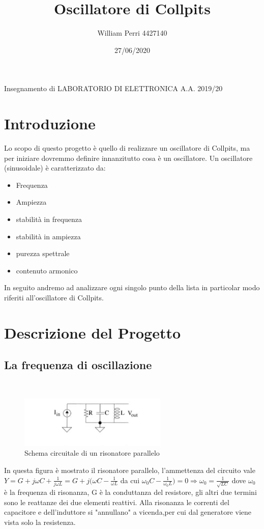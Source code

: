 \documentclass{article}
\title{Oscillatore di Collpits}
\author{William Perri 4427140 }
\date{27/06/2020}
\begin{document}
\maketitle
Insegnamento di LABORATORIO DI ELETTRONICA A.A. 2019/20

\newpage
\tableofcontents
\newpage
\section{Introduzione}
Lo scopo di questo progetto è quello di realizzare un oscillatore di Collpits, ma per iniziare dovremmo definire innanzitutto cosa è un oscillatore.
Un oscillatore (sinusoidale) è caratterizzato da:
\begin{itemize}
\item Frequenza
\item Ampiezza
\item stabilità in frequenza
\item stabilità in ampiezza
\item purezza spettrale
\item contenuto armonico
\end{itemize}
In seguito andremo ad analizzare ogni singolo punto della lista in particolar modo riferiti all'oscillatore di Collpits.
\newpage
\section{Descrizione del Progetto}
\subsection{La frequenza di oscillazione}
~\begin{figure}[H]
\includegraphics[scale=2]{RisonatoreParallelo.png} 
\centering
\caption{Schema circuitale di un risonatore parallelo}
\label{fig:foo}
\end{figure}
In questa figura è mostrato il risonatore parallelo, l'ammettenza del circuito vale 
$Y=G+j\omega C+\frac{1}{j\omega L}=G+j(\omega C-\frac{1}{\omega L}$ da cui $\omega_0C-\frac{1}{\omega _0L})=0 \Rightarrow \omega _0=\frac{1}{\sqrt{LC}}$ dove $\omega _0$ è la frequenza di risonanza, G è la conduttanza del resistore, gli altri due termini sono le reattanze dei due elementi reattivi.
Alla risonanza le correnti del capacitore e dell'induttore si "annullano" a vicenda,per cui dal generatore viene vista solo la resistenza. 
\end{document}
